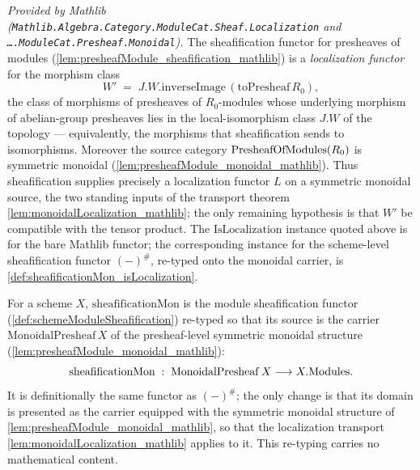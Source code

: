 \begin{lemma}
  \label{lem:moduleSheafification_isLocalization_mathlib}
  \mathlibok
  \textit{Provided by Mathlib
  (\texttt{Mathlib.Algebra.Category.ModuleCat.Sheaf.Localization} and
  \texttt{\ldots.ModuleCat.Presheaf.Monoidal}).}
  The sheafification functor for presheaves of modules
  (\cref{lem:presheafModule_sheafification_mathlib}) is a \emph{localization
  functor} for the morphism class
  \[
    W' \;=\; J.W.\mathrm{inverseImage}\,(\mathrm{toPresheaf}\,R_0),
  \]
  the class of morphisms of presheaves of \(R_0\)-modules whose underlying
  morphism of abelian-group presheaves lies in the local-isomorphism class
  \(J.W\) of the topology --- equivalently, the morphisms that sheafification
  sends to isomorphisms. Moreover the source category \(\mathrm{PresheafOfModules}(R_0)\) is
  symmetric monoidal (\cref{lem:presheafModule_monoidal_mathlib}). Thus
  sheafification supplies precisely a localization functor \(L\) on a symmetric
  monoidal source, the two standing inputs of the transport theorem
  \cref{lem:monoidalLocalization_mathlib}; the only remaining hypothesis is that
  \(W'\) be compatible with the tensor product. The \(\mathrm{IsLocalization}\)
  instance quoted above is for the bare Mathlib functor; the corresponding
  instance for the scheme-level sheafification functor
  \(\mathbf{(-)}^{\#}\), re-typed onto the monoidal carrier, is
  \cref{def:sheafificationMon_isLocalization}.
\end{lemma}

\begin{definition}

  \label{def:sheafificationMon}
  For a scheme \(X\), \(\mathrm{sheafificationMon}\) is the module sheafification
  functor (\cref{def:schemeModuleSheafification}) re-typed so that its source is
  the carrier \(\mathrm{MonoidalPresheaf}\,X\) of the presheaf-level symmetric
  monoidal structure (\cref{lem:presheafModule_monoidal_mathlib}):
  \[
    \mathrm{sheafificationMon} \;:\;
      \mathrm{MonoidalPresheaf}\,X \longrightarrow X.\mathrm{Modules} .
  \]
  It is definitionally the same functor as \((-)^{\#}\); the only change is that
  its domain is presented as the carrier equipped with the symmetric monoidal
  structure of \cref{lem:presheafModule_monoidal_mathlib}, so that the localization
  transport \cref{lem:monoidalLocalization_mathlib} applies to it. This re-typing
  carries no mathematical content.
\end{definition}

